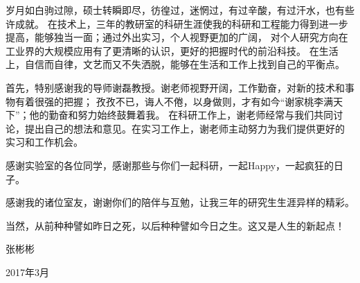 

\vspace{2ex}
岁月如白驹过隙，硕士转瞬即尽，彷徨过，迷惘过，有过辛酸，有过汗水，也有些许成就。
在技术上，三年的教研室的科研生涯使我的科研和工程能力得到进一步提高，能够独当一面；通过外出实习，个人视野更加的广阔，
对个人研究方向在工业界的大规模应用有了更清晰的认识，更好的把握时代的前沿科技。
在生活上，自信而自律，文艺而又不失洒脱，能够在生活和工作上找到自己的平衡点。


首先，特别感谢我的导师谢磊教授。谢老师视野开阔，工作勤奋，对新的技术和事物有着很强的把握；
孜孜不已，诲人不倦，以身做则，才有如今“谢家桃李满天下”；他的勤奋和努力始终鼓舞着我。
在科研工作上，谢老师经常与我们共同讨论，提出自己的想法和意见。在实习工作上，谢老师主动努力为我们提供更好的
实习和工作机会。

感谢实验室的各位同学，感谢那些与你们一起科研，一起Happy，一起疯狂的日子。

感谢我的诸位室友，谢谢你们的陪伴与互勉，让我三年的研究生生涯异样的精彩。

当然，从前种种譬如昨日之死，以后种种譬如今日之生。这又是人生的新起点！


\quad\quad\quad\quad\quad\quad\quad\quad\quad\quad\quad\quad\quad\quad\quad\quad\quad\quad\quad\quad\quad\quad\quad\quad\quad\quad\quad\quad\quad\quad 张彬彬

\quad\quad\quad\quad\quad\quad\quad\quad\quad\quad\quad\quad\quad\quad\quad\quad\quad\quad\quad\quad\quad\quad\quad\quad\quad\quad\quad\quad\quad 2017年3月




\clearpage\mbox{}

